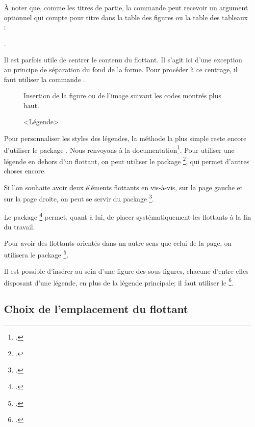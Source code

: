 À noter que, comme les titres de partie, la commande  peut recevoir un argument optionnel qui compte pour titre dans la table des figures ou la table des tableaux : 

. 


\begin{plusloins}

Il est parfois  utile de centrer le contenu du flottant. Il s'agit ici d'une exception au principe de séparation du fond de la forme. Pour procéder à ce centrage, il faut utiliser la commande .

\begin{latexcode}
\begin{figure}[<paramètre de placement>]
    \centering
    Insertion de la figure ou de l'image suivant les codes montrés plus haut.
    \caption{<Légende>}
\end{figure} 
\end{latexcode}


Pour personnaliser les styles des légendes, la méthode la plus simple reste encore d'utiliser le package . Nous renvoyons à la documentation\footcite{caption}.
Pour utiliser une légende en dehors d'un flottant, on peut utiliser le package \footcite{ccaption}, qui permet d'autres choses encore.

Si l'on souhaite avoir deux éléments flottants en vis-à-vis, sur la page gauche et sur la page droite, on peut  se servir du package \footcite{dpfloat}.

Le package \footcite{endfloat} permet, quant à lui, de placer systématiquement les flottants à la fin du travail.

Pour avoir des flottants orientés dans un autre sens que celui de la page, on utilisera le package \footcite{rotfloat}.

Il est possible d'insérer au sein d'une figure des sous-figures, chacune d'entre elles disposant d'une légende, en plus de la légende principale; il faut utiliser le  \footcite{subcaption}.
\end{plusloins}



\subsection{Choix de l'emplacement du flottant}

